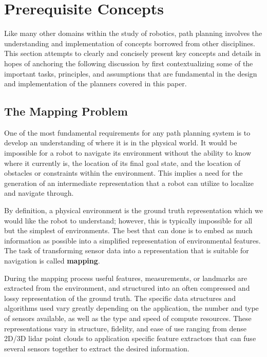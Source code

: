 \section{Prerequisite Concepts}

Like many other domains within the study of robotics, path planning involves the understanding and implementation of concepts borrowed from other disciplines. This section attempts to clearly and concisely present key concepts and details in hopes of anchoring the following discussion by first contextualizing some of the important tasks, principles, and assumptions that are fundamental in the design and implementation of the planners covered in this paper.

\subsection{The Mapping Problem}

One of the most fundamental requirements for any path planning system is to develop an understanding of where it is in the physical world. It would be impossible for a robot to navigate its environment without the ability to know where it currently is, the location of its final goal state, and the location of obstacles or constraints within the environment. This implies a need for the generation of an intermediate representation that a robot can utilize to localize and navigate through.  

By definition, a physical environment is the ground truth representation which we would like the robot to understand; however, this is typically impossible for all but the simplest of environments. The best that can done is to embed as much information as possible into a simplified representation of environmental features. The task of transforming sensor data into a representation that is suitable for navigation is called \textbf{mapping}.  

During the mapping process useful features, measurements, or landmarks are extracted from the environment, and structured into an often compressed and lossy representation of the ground truth. The specific data structures and algorithms used vary greatly depending on the application, the number and type of sensors available, as well as the type and speed of compute resources. These representations vary in structure, fidelity, and ease of use ranging from dense 2D/3D lidar point clouds to application specific feature extractors that can fuse several sensors together to extract the desired information. 

